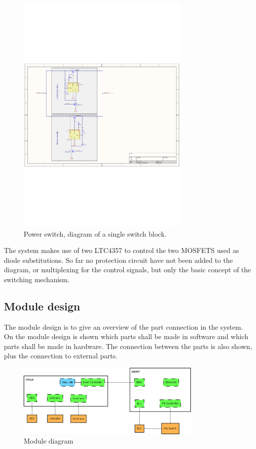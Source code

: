 \begin{figure}[H]
	\begin{centering}
		\includegraphics[width=0.75\textwidth,page=1,angle=0]{images/PS_initial_drawing.pdf}
		\caption{Power switch, diagram of a single switch block.}
		\label{fig:ps_switch_dia_v0_1}
	\end{centering}
\end{figure}
The system makes use of two LTC4357 to control the two MOSFETS used as diode substitutions. So far no protection circuit have not been added to the diagram, or multiplexing for the control signals, but only the basic concept of the switching mechanism.

\subsection{Module design}

The module design is to give an overview of the part connection in the system. On the module design is shown which parts shall be made in software and which parts shall be made in hardware. The connection between the parts is also shown, plus the connection to external parts.

\begin{figure}[H]
	\begin{centering}
		\includegraphics[width=0.8\textwidth,page=1,angle=0]{images/module_design.png}
		\caption{Module diagram}
		\label{fig:module_design_diagram}
	\end{centering}
\end{figure}

